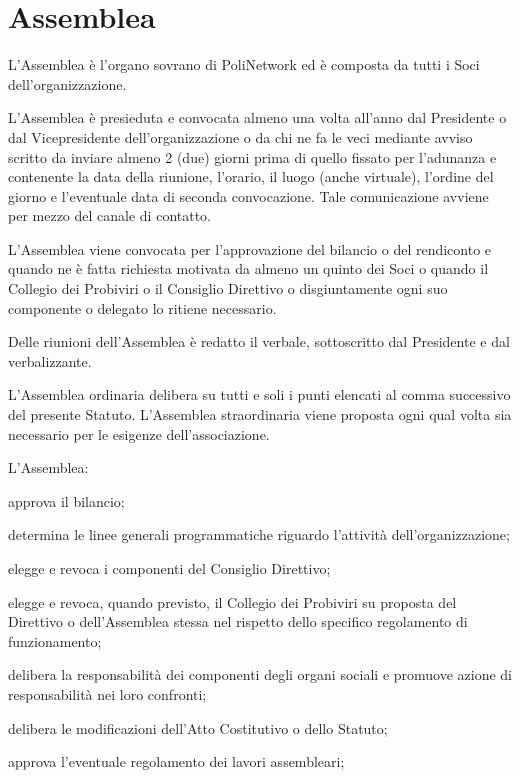 \documentclass[legalpaper, 11pt]{exam}
\let\tempone\enumerate
\let\temptwo\endenumerate
\renewenvironment{enumerate}{\tempone\addtolength{\itemsep}{-0.45\baselineskip}}{\temptwo}
\begin{document}
{\section{Assemblea}
\begin{enumerate}
 \item L’Assemblea è l’organo sovrano di PoliNetwork ed è composta da tutti i Soci dell’organizzazione.
 \item L’Assemblea è presieduta e convocata almeno una volta all’anno dal Presidente o dal Vicepresidente dell’organizzazione o da chi ne fa le veci mediante avviso scritto da inviare almeno 2 (due) giorni prima di quello fissato per l’adunanza e contenente la data della riunione, l’orario, il luogo (anche virtuale), l’ordine del giorno e l’eventuale data di seconda convocazione. Tale comunicazione avviene per mezzo del canale di contatto.
 \item L’Assemblea viene convocata per l’approvazione del bilancio o del rendiconto e quando ne è fatta richiesta motivata da almeno un quinto dei Soci o quando il Collegio dei Probiviri o il Consiglio Direttivo o disgiuntamente ogni suo componente o delegato lo ritiene necessario.
 \item Delle riunioni dell’Assemblea è redatto il verbale, sottoscritto dal Presidente e dal verbalizzante.
 \item L’Assemblea ordinaria delibera su tutti e soli i punti elencati al comma successivo del presente Statuto. L’Assemblea straordinaria viene proposta ogni qual volta sia necessario per le esigenze dell’associazione.
 \item L'Assemblea:
 \vspace{-5pt}
 \begin{enumerate}
  \item approva il bilancio;
  \item determina le linee generali programmatiche riguardo l’attività dell’organizzazione;
  \item elegge e revoca i componenti del Consiglio Direttivo;
  \item elegge e revoca, quando previsto, il Collegio dei Probiviri su proposta del Direttivo o dell’Assemblea stessa nel rispetto dello specifico regolamento di funzionamento;
  \item delibera la responsabilità dei componenti degli organi sociali e promuove azione di responsabilità nei loro confronti;
  \item delibera le modificazioni dell’Atto Costitutivo o dello Statuto;
  \item approva l’eventuale regolamento dei lavori assembleari;

\end{enumerate}
\end{enumerate}}
\end{document}

